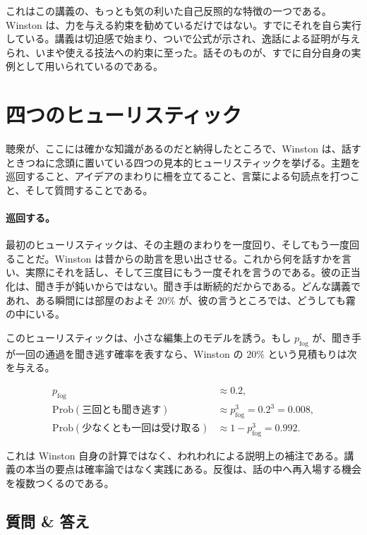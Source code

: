 これはこの講義の、もっとも気の利いた自己反照的な特徴の一つである。Winston は、力を与える約束を勧めているだけではない。すでにそれを自ら実行している。講義は切迫感で始まり、ついで公式が示され、逸話による証明が与えられ、いまや使える技法への約束に至った。話そのものが、すでに自分自身の実例として用いられているのである。

\section{四つのヒューリスティック}

聴衆が、ここには確かな知識があるのだと納得したところで、Winston は、話すときつねに念頭に置いている四つの見本的ヒューリスティックを挙げる。主題を巡回すること、アイデアのまわりに柵を立てること、言葉による句読点を打つこと、そして質問することである。

\paragraph{巡回する。} 最初のヒューリスティックは、その主題のまわりを一度回り、そしてもう一度回ることだ。Winston は昔からの助言を思い出させる。これから何を話すかを言い、実際にそれを話し、そして三度目にもう一度それを言うのである。彼の正当化は、聞き手が鈍いからではない。聞き手は断続的だからである。どんな講義であれ、ある瞬間には部屋のおよそ \(20\%\) が、彼の言うところでは、どうしても霧の中にいる。

このヒューリスティックは、小さな編集上のモデルを誘う。もし \(p_{\mathrm{fog}}\) が、聞き手が一回の通過を聞き逃す確率を表すなら、Winston の \(20\%\) という見積もりは次を与える。

\begin{align}
p_{\mathrm{fog}} &\approx 0.2,\\
\mathrm{Prob}(\text{三回とも聞き逃す}) &\approx p_{\mathrm{fog}}^3 = 0.2^3 = 0.008,\\
\mathrm{Prob}(\text{少なくとも一回は受け取る}) &\approx 1-p_{\mathrm{fog}}^3 = 0.992.
\end{align}

\begin{remark}
これは Winston 自身の計算ではなく、われわれによる説明上の補注である。講義の本当の要点は確率論ではなく実践にある。反復は、話の中へ再入場する機会を複数つくるのである。
\end{remark}

\subsection{質問 \& 答え}

